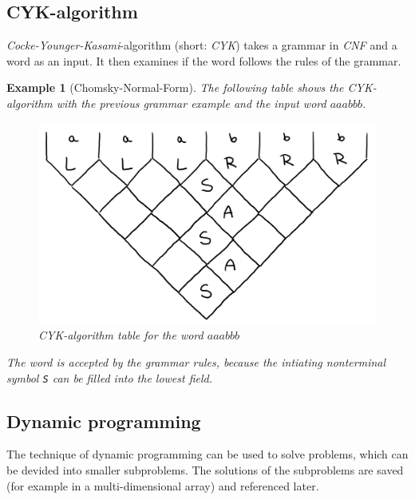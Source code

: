\documentclass[a4paper, 11pt]{article}
\newtheorem*{example*}{Example}
\begin{document}

\subsection{CYK-algorithm}
\label{cyk}
\textit{Cocke-Younger-Kasami}-algorithm (short: \textit{CYK}) takes a grammar in \textit{CNF} and a word as an input. It then examines if the word follows the rules of the grammar. \cite{CYK1}

\begin{example*}[Chomsky-Normal-Form]
The following table shows the CYK-algorithm with the previous grammar example and the input word $aaabbb$. \cite{cyk_online_alg}
\begin{figure}[H]
\begin{center}
\includegraphics[scale=0.3]{images/cyk_table.png}
\end{center}
\caption{CYK-algorithm table for the word $aaabbb$}
\end{figure}
The word is accepted by the grammar rules, because the intiating nonterminal symbol \textit{\texttt{S}} can be filled into the lowest field.
\end{example*}


\subsection{Dynamic programming}
\label{dp}

The technique of dynamic programming can be used to solve problems, which can be devided into smaller subproblems. The solutions of the subproblems are saved (for example in a multi-dimensional array) and referenced later. \cite{DP}
\end{document}
